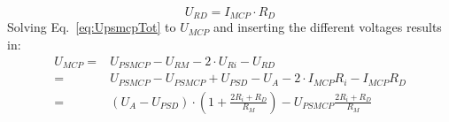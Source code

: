 		\begin{equation}
			U_{RD} = I_{MCP}\cdot R_D
		\end{equation}
		Solving Eq.~\eqref{eq:UpsmcpTot} to $U_{MCP}$ and inserting the different voltages results in:
		\begin{align}
			U_{MCP} =& U_{PSMCP} - U_{RM} - 2\cdot U_{Ri} - U_{RD}\\
			=& U_{PSMCP} - U_{PSMCP} + U_{PSD} - U_A - 2\cdot I_{MCP} R_i - I_{MCP} R_D\\
			=& (U_A - U_{PSD})\cdot(1 + \frac{2R_i + R_D}{R_M}) - U_{PSMCP}\frac{2R_i + R_D}{R_M}
		\end{align}
		

